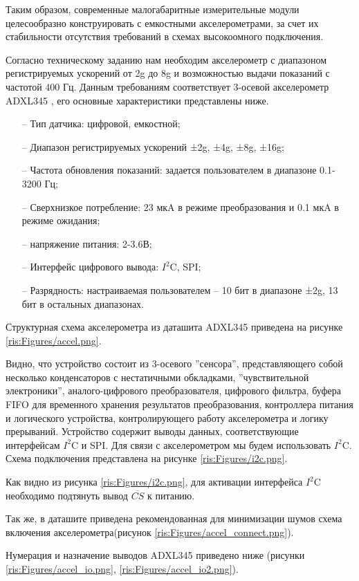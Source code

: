 Таким образом, современные малогабаритные измерительные модули целесообразно конструировать с емкостными акселерометрами, за счет их стабильности отсутствия требований в схемах высокоомного подключения.


Согласно техническому заданию нам необходим акселерометр с диапазоном регистрируемых ускорений от 2g до 8g и возможностью выдачи показаний с частотой 400 Гц. Данным требованиям соответствует 3-осевой акселерометр ADXL345 \cite {ADXL}, его основные характеристики представлены ниже.


\begin{onehalfspace}
\begin{itemize}
	\item[--] Тип датчика: цифровой, емкостной;
	\item[--]Диапазон регистрируемых ускорений ±2g, ±4g, ±8g, ±16g;
	\item[--]Частота обновления показаний: задается пользователем в диапазоне 0.1-3200 Гц;
	\item[--]Сверхнизкое потребление:  23 мкA в режиме преобразования и 0.1 мкA в режиме ожидания;
	\item[--] напряжение питания: 2-3.6В;
	\item[--] Интерфейс цифрового вывода: $I^2$C, SPI; 
	\item[--] Разрядность: настраиваемая пользователем -- 10 бит в диапазоне ±2g, 13 бит в остальных диапазонах.	
\end{itemize}
\end{onehalfspace}




Структурная схема акселерометра из даташита ADXL345 приведена на рисунке \ref{ris:Figures/accel.png}.


Видно, что устройство состоит из 3-осевого ''сенсора'',  представляющего собой несколько конденсаторов с нестатичными обкладками, ''чувствительной электроники'', аналого-цифрового преобразователя, цифрового фильтра, буфера FIFO для временного хранения результатов преобразования, контроллера питания и логического устройства, контролирующего работу акселерометра и логику прерываний. Устройство содержит выводы данных, соответствующие интерфейсам $I^2$C и SPI. Для связи с акселерометром мы будем использовать $I^2$C. Схема подключения представлена на рисунке \ref{ris:Figures/i2c.png}.




Как видно из рисунка \ref{ris:Figures/i2c.png}, для активации интерфейса $I^2$C необходимо подтянуть вывод $\overline{CS}$ к питанию.

Так же, в даташите приведена рекомендованная для минимизации шумов схема включения акселерометра(рисунок \ref{ris:Figures/accel_connect.png}).

Нумерация и назначение выводов ADXL345 приведено ниже (рисунки \ref{ris:Figures/accel_io.png}, \ref{ris:Figures/accel_io2.png}).


